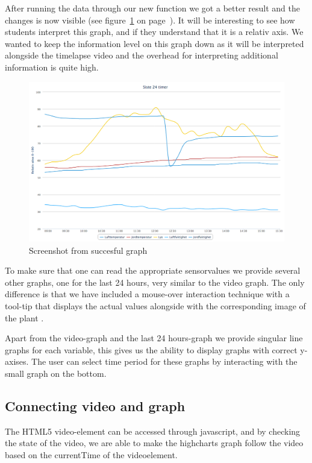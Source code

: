 After running the data through our new function we got a better result and the changes is now visible (see figure~\ref{fig:goodgraph} on page~\pageref{fig:goodgraph}). It will be interesting to see how students interpret this graph, and if they understand that it is a relativ axis. We wanted to keep the information level on this graph down as it will be interpreted alongside the timelapse video and the overhead for interpreting additional information is quite high.  

\begin{figure}
\centering
\includegraphics[width=1\textwidth]{img/interface/goodgraph.png}
\caption{Screenshot from succesful graph}
\label{fig:goodgraph}
\end{figure}

To make sure that one can read the appropriate sensorvalues we provide several other graphs, one for the last 24 hours, very similar to the video graph. The only difference is that we have included a mouse-over interaction technique with a tool-tip that displays the actual values alongside with the corresponding image of the plant \citep[p.254]{kluge2010simulation}.

Apart from the video-graph and the last 24 hours-graph we provide singular line graphs for each variable, this gives us the ability to display graphs with correct y-axises. The user can select time period for these graphs by interacting with the small graph on the bottom. 

\subsection{Connecting video and graph}
 The HTML5 video-element can be accessed through javascript, and by checking the state of the video, we are able to make the highcharts graph follow the video based on the currentTime of the videoelement.

